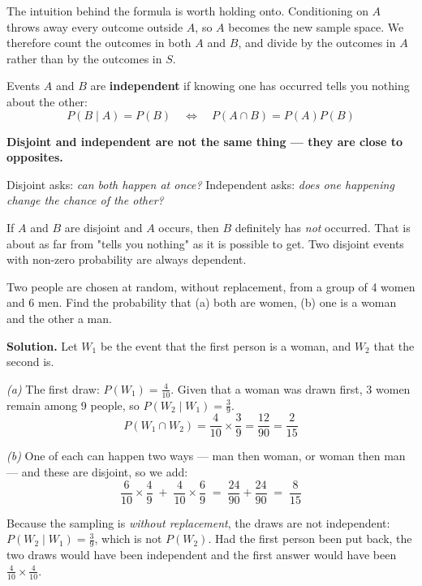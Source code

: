 \documentclass[a4paper,11pt]{article}
\begin{document}
The intuition behind the formula is worth holding onto. Conditioning on $A$
throws away every outcome outside $A$, so $A$ becomes the new sample space. We
therefore count the outcomes in both $A$ and $B$, and divide by the outcomes in
$A$ rather than by the outcomes in $S$.

\begin{keybox}
Events $A$ and $B$ are \textbf{independent} if knowing one has occurred tells
you nothing about the other:
\[ P(B \mid A) = P(B) \quad\Longleftrightarrow\quad P(A \cap B) = P(A)P(B) \]
\end{keybox}

\begin{watchbox}
\textbf{Disjoint and independent are not the same thing --- they are close to
opposites.}

Disjoint asks: \emph{can both happen at once?} Independent asks: \emph{does one
happening change the chance of the other?}

If $A$ and $B$ are disjoint and $A$ occurs, then $B$ definitely has \emph{not}
occurred. That is about as far from "tells you nothing" as it is possible to
get. Two disjoint events with non-zero probability are always dependent.
\end{watchbox}

\begin{example}
Two people are chosen at random, without replacement, from a group of 4 women
and 6 men. Find the probability that (a) both are women, (b) one is a woman and
the other a man.

\medskip
\textbf{Solution.} Let $W_1$ be the event that the first person is a woman, and
$W_2$ that the second is.

\emph{(a)} The first draw: $P(W_1) = \frac{4}{10}$. Given that a woman was drawn
first, 3 women remain among 9 people, so $P(W_2 \mid W_1) = \frac{3}{9}$.
\[ P(W_1 \cap W_2) = \frac{4}{10} \times \frac{3}{9} = \frac{12}{90} = \frac{2}{15} \]

\emph{(b)} One of each can happen two ways --- man then woman, or woman then
man --- and these are disjoint, so we add:
\[ \frac{6}{10}\times\frac{4}{9} \;+\; \frac{4}{10}\times\frac{6}{9}
   \;=\; \frac{24}{90} + \frac{24}{90} \;=\; \frac{8}{15} \]

Because the sampling is \emph{without replacement}, the draws are not
independent: $P(W_2 \mid W_1) = \frac{3}{9}$, which is not $P(W_2)$. Had the
first person been put back, the two draws would have been independent and the
first answer would have been $\frac{4}{10}\times\frac{4}{10}$.
\end{example}
\end{document}
